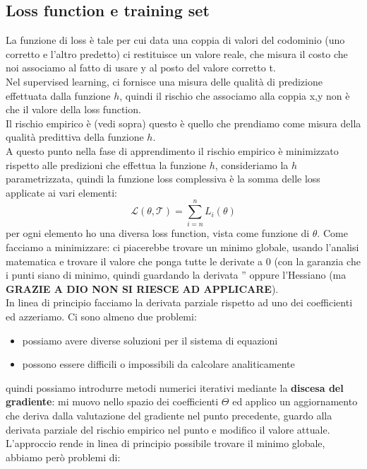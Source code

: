 \documentclass[12pt, oneside]{extbook}
\begin{document}
\subsection{Loss function e training set}
La funzione di loss è tale per cui data una coppia di valori del codominio (uno corretto e l'altro predetto) ci restituisce un valore reale, che misura il costo che noi associamo al fatto di usare y al posto del valore corretto t.\\Nel supervised learning, ci fornisce una misura delle qualità di predizione effettuata dalla funzione $h$, quindi il rischio che associamo alla coppia x,y non è che il valore della loss function.\\Il rischio empirico è (vedi sopra) questo è quello che prendiamo come misura della qualità predittiva della funzione $h$.\\A questo punto nella fase di apprendimento il rischio empirico è minimizzato rispetto alle predizioni che effettua la funzione $h$, consideriamo la $h$ parametrizzata, quindi la funzione loss complessiva è la somma delle loss applicate ai vari elementi:
\begin{equation}
	\mathscr{L}(\theta, \mathscr{T}) = \sum\limits_{i = n}^{n} L_i(\theta)
\end{equation}
per ogni elemento ho una diversa loss function, vista come funzione di $\theta$. Come facciamo a minimizzare: ci piacerebbe trovare un minimo globale, usando l'analisi matematica e trovare il valore che ponga tutte le derivate a 0 (con la garanzia che i punti siano di minimo, quindi guardando la derivata '' oppure l'Hessiano (ma \textsf{\textbf{GRAZIE A DIO NON SI RIESCE AD APPLICARE}}).\\In linea di principio facciamo la derivata parziale rispetto ad uno dei coefficienti ed azzeriamo. Ci sono almeno due problemi:
\begin{itemize}
	\item possiamo avere diverse soluzioni per il sistema di equazioni
	\item possono essere difficili o impossibili da calcolare analiticamente
\end{itemize}
quindi possiamo introdurre metodi numerici iterativi mediante la \textbf{discesa del gradiente}: mi muovo nello spazio dei coefficienti $\Theta$ ed applico un aggiornamento che deriva dalla valutazione del gradiente nel punto precedente, guardo alla derivata parziale del rischio empirico nel punto e modifico il valore attuale.\\L'approccio rende in linea di principio possibile trovare il minimo globale, abbiamo però problemi di:
\end{document}
